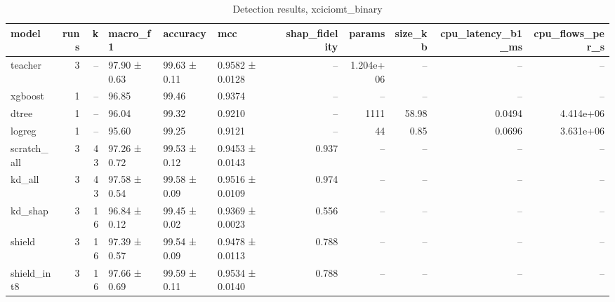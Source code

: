 \begin{table}
\caption{Detection results, xciciomt_binary}
\begin{tabular}{lrrlllrrrrr}
\toprule
model & runs & k & macro_f1 & accuracy & mcc & shap_fidelity & params & size_kb & cpu_latency_b1_ms & cpu_flows_per_s \\
\midrule
teacher & 3 & -- & 97.90 ± 0.63 & 99.63 ± 0.11 & 0.9582 ± 0.0128 & -- & 1.204e+06 & -- & -- & -- \\
xgboost & 1 & -- & 96.85 & 99.46 & 0.9374 & -- & -- & -- & -- & -- \\
dtree & 1 & -- & 96.04 & 99.32 & 0.9210 & -- & 1111 & 58.98 & 0.0494 & 4.414e+06 \\
logreg & 1 & -- & 95.60 & 99.25 & 0.9121 & -- & 44 & 0.85 & 0.0696 & 3.631e+06 \\
scratch_all & 3 & 43 & 97.26 ± 0.72 & 99.53 ± 0.12 & 0.9453 ± 0.0143 & 0.937 & -- & -- & -- & -- \\
kd_all & 3 & 43 & 97.58 ± 0.54 & 99.58 ± 0.09 & 0.9516 ± 0.0109 & 0.974 & -- & -- & -- & -- \\
kd_shap & 3 & 16 & 96.84 ± 0.12 & 99.45 ± 0.02 & 0.9369 ± 0.0023 & 0.556 & -- & -- & -- & -- \\
shield & 3 & 16 & 97.39 ± 0.57 & 99.54 ± 0.09 & 0.9478 ± 0.0113 & 0.788 & -- & -- & -- & -- \\
shield_int8 & 3 & 16 & 97.66 ± 0.69 & 99.59 ± 0.11 & 0.9534 ± 0.0140 & 0.788 & -- & -- & -- & -- \\
\bottomrule
\end{tabular}
\end{table}
